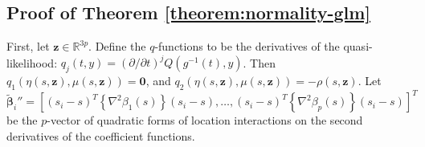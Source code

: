 \documentclass[authoryear,review, 12pt]{elsarticle}
\begin{document}
\subsection*{Proof of Theorem \ref{theorem:normality-glm}}
First, let $\bm{z}\in\mathbb{R}^{3p}$. Define the $q$-functions
to be the derivatives of the quasi-likelihood: $q_{j}(t,y)=\left(\partial/\partial t\right)^{j}Q\left(g^{-1}(t),y\right)$.
Then $q_{1}\left(\eta\left(s,\bm{z}\right),\mu\left(s,\bm{z}\right)\right)=\bm{0}$,
and $q_{2}\left(\eta\left(s,\bm{z}\right),\mu\left(s,\bm{z}\right)\right)=-\rho\left(s,\bm{z}\right)$.
Let 
\[
\tilde{\bm{\beta}}_{i}''=\left[\left(s_{i}-s\right)^{T}\left\{ \nabla^{2}\beta_{1}(s)\right\} \left(s_{i}-s\right),\dots,\left(s_{i}-s\right)^{T}\left\{ \nabla^{2}\beta_{p}(s)\right\} \left(s_{i}-s\right)\right]^{T}
\]
 be the $p$-vector of quadratic forms of location interactions on
the second derivatives of the coefficient functions.
\end{document}
